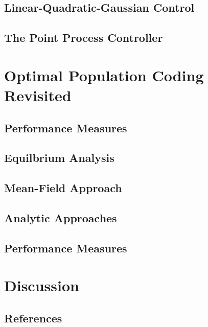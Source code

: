 \documentclass[justified,notitlepage]{tufte-book}   	%
\begin{document}
\section{Linear-Quadratic-Gaussian Control}

\section{The Point Process Controller}

\chapter{Optimal Population Coding Revisited}

\label{chap:optimal}

\section{Performance Measures}

\section{Equilbrium Analysis}

\section{Mean-Field Approach}

\section{Analytic Approaches}

\section{Performance Measures}

\chapter{Discussion}


\section{References}
{}

\end{document}
